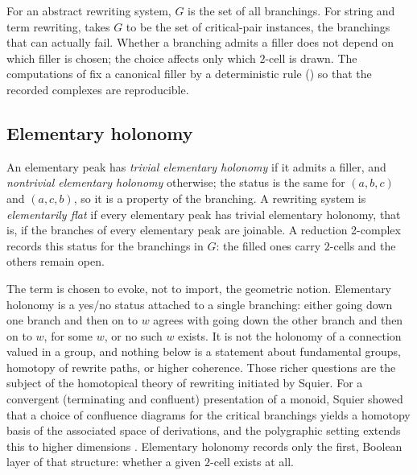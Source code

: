 For an abstract rewriting system, $G$ is the set of all branchings. For string and term rewriting,  takes $G$ to be the set of critical-pair instances, the branchings that can actually fail. Whether a branching admits a filler does not depend on which filler is chosen; the choice affects only which $2$-cell is drawn. The computations of  fix a canonical filler by a deterministic rule () so that the recorded complexes are reproducible.

\subsection{Elementary holonomy}

\begin{definition}
\label{def:elementary-holonomy-status}
An elementary peak has \emph{trivial elementary holonomy} if it admits a filler, and \emph{nontrivial elementary holonomy} otherwise; the status is the same for $(a,b,c)$ and $(a,c,b)$, so it is a property of the branching. A rewriting system is \emph{elementarily flat} if every elementary peak has trivial elementary holonomy, that is, if the branches of every elementary peak are joinable. A reduction 2-complex records this status for the branchings in $G$: the filled ones carry $2$-cells and the others remain open.
\end{definition}

The term is chosen to evoke, not to import, the geometric notion. Elementary holonomy is a yes/no status attached to a single branching: either going down one branch and then on to $w$ agrees with going down the other branch and then on to $w$, for some $w$, or no such $w$ exists. It is not the holonomy of a connection valued in a group, and nothing below is a statement about fundamental groups, homotopy of rewrite paths, or higher coherence. Those richer questions are the subject of the homotopical theory of rewriting initiated by Squier. For a convergent (terminating and confluent) presentation of a monoid, Squier showed that a choice of confluence diagrams for the critical branchings yields a homotopy basis of the associated space of derivations, and the polygraphic setting extends this to higher dimensions \cite{Squier1987,SquierOtto1987,GuiraudMalbos2012,GuiraudMalbos2018,Mimram2023}. Elementary holonomy records only the first, Boolean layer of that structure: whether a given $2$-cell exists at all.


